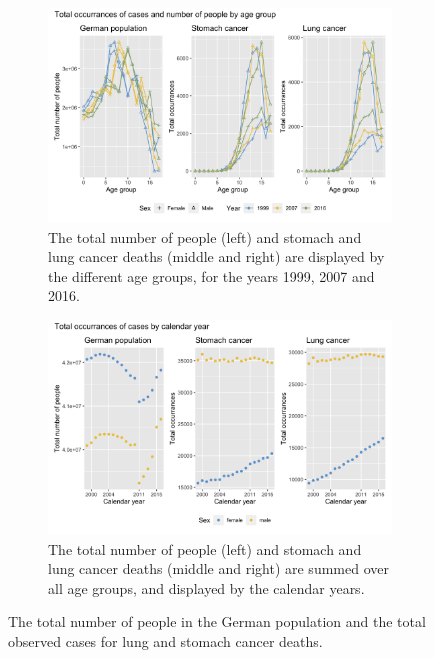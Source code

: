 \begin{figure}
    \centering
    \begin{subfigure}[b]{.75\linewidth}
        \includegraphics[width=\linewidth]{real-data/real-data-univariate/Figures/data-age-total.png}
        \caption{The total number of people (left) and stomach and lung cancer deaths (middle and right) are displayed by the different age groups, for the years 1999, 2007 and 2016.}
        \label{fig:data-total-top}
    \end{subfigure}
    
    \begin{subfigure}[b]{.75\linewidth}
        \includegraphics[width=\linewidth]{real-data/real-data-univariate/Figures/data-year-total.png}
        \caption{The total number of people (left) and stomach and lung cancer deaths (middle and right) are summed over all age groups, and displayed by the calendar years. }
    \end{subfigure}
    \caption{The total number of people in the German population and the total observed cases for lung and stomach cancer deaths.}
    \label{fig:data-total}
\end{figure}

